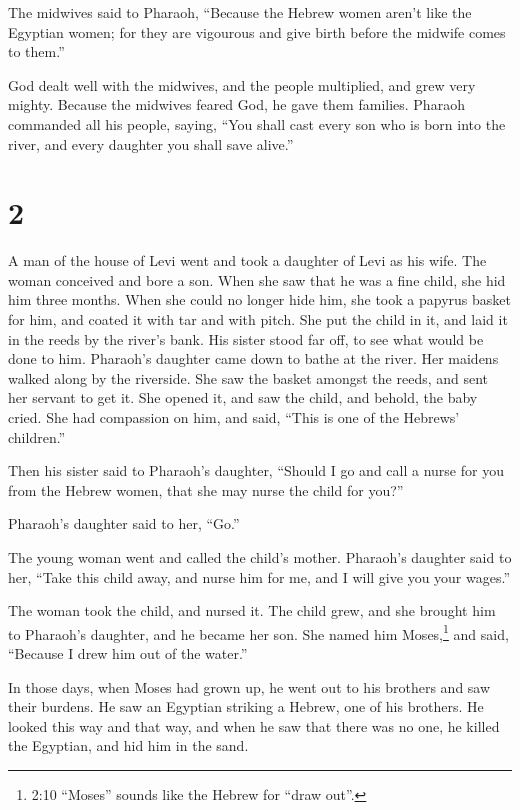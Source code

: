  The midwives said to Pharaoh, ``Because the Hebrew women
aren't like the Egyptian women; for they are vigourous and give birth
before the midwife comes to them.''

 God dealt well with the midwives, and the people
multiplied, and grew very mighty.  Because the midwives
feared God, he gave them families.  Pharaoh commanded all
his people, saying, ``You shall cast every son who is born into the
river, and every daughter you shall save alive.''

\hypertarget{section-1}{%
\section{2}\label{section-1}}

 A man of the house of Levi went and took a daughter of Levi
as his wife.  The woman conceived and bore a son. When she
saw that he was a fine child, she hid him three months. 
When she could no longer hide him, she took a papyrus basket for him,
and coated it with tar and with pitch. She put the child in it, and laid
it in the reeds by the river's bank.  His sister stood far
off, to see what would be done to him.  Pharaoh's daughter
came down to bathe at the river. Her maidens walked along by the
riverside. She saw the basket amongst the reeds, and sent her servant to
get it.  She opened it, and saw the child, and behold, the
baby cried. She had compassion on him, and said, ``This is one of the
Hebrews' children.''

 Then his sister said to Pharaoh's daughter, ``Should I go
and call a nurse for you from the Hebrew women, that she may nurse the
child for you?''

 Pharaoh's daughter said to her, ``Go.''

The young woman went and called the child's mother. 
Pharaoh's daughter said to her, ``Take this child away, and nurse him
for me, and I will give you your wages.''

The woman took the child, and nursed it.  The child grew,
and she brought him to Pharaoh's daughter, and he became her son. She
named him Moses,\footnote{2:10 ``Moses'' sounds like the Hebrew for
  ``draw out''.} and said, ``Because I drew him out of the water.''

 In those days, when Moses had grown up, he went out to his
brothers and saw their burdens. He saw an Egyptian striking a Hebrew,
one of his brothers.  He looked this way and that way, and
when he saw that there was no one, he killed the Egyptian, and hid him
in the sand.

